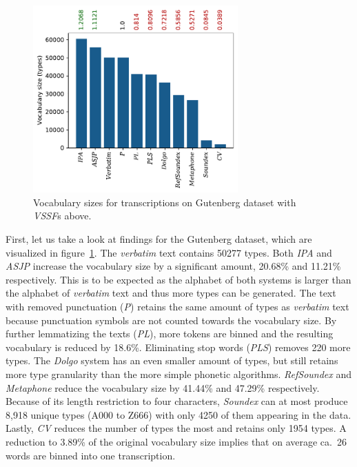 \begin{figure}
  \centering
  \includegraphics[width=0.7\textwidth]{figures/vocab_sizes_2021-07-28_14-42-08_gb_pt}
  \caption{Vocabulary sizes for transcriptions on Gutenberg dataset with \textit{VSSF}s above.}
  \label{fig:vssf_transcriptions_gb}
\end{figure}
First, let us take a look at findings for the Gutenberg dataset, which are visualized in figure~\ref{fig:vssf_transcriptions_gb}.
The \textit{verbatim} text contains 50277 types.
Both \textit{IPA} and \textit{ASJP} increase the vocabulary size by a significant amount, 20.68\% and 11.21\% respectively.
This is to be expected as the alphabet of both systems is larger than the alphabet of \textit{verbatim} text and thus more types can be generated.
The text with removed punctuation (\textit{P}) retains the same amount of types as \textit{verbatim} text because punctuation symbols are not counted towards the vocabulary size.
By further lemmatizing the texts (\textit{PL}), more tokens are binned and the resulting vocabulary is reduced by 18.6\%.
Eliminating stop words (\textit{PLS}) removes 220 more types.
The \textit{Dolgo} system has an even smaller amount of types, but still retains more type granularity than the more simple phonetic algorithms.
\textit{RefSoundex} and \textit{Metaphone} reduce the vocabulary size by 41.44\% and 47.29\% respectively.
Because of its length restriction to four characters, \textit{Soundex} can at most produce 8,918 unique types (A000 to Z666) with only 4250 of them appearing in the data.
Lastly, \textit{CV} reduces the number of types the most and retains only 1954 types.
A reduction to 3.89\% of the original vocabulary size implies that on average ca.\ 26 words are binned into one transcription.\\
